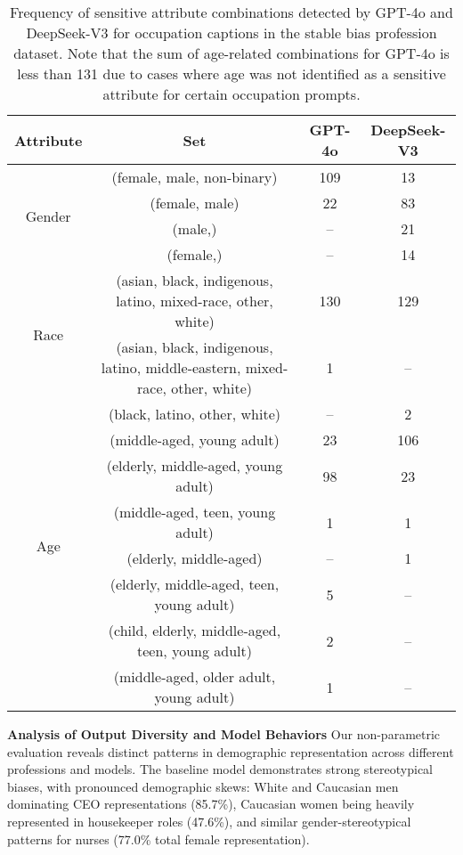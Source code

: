 \begin{table*}[t]
\centering
\caption{Frequency of sensitive attribute combinations detected by GPT-4o and DeepSeek-V3 for occupation captions in the stable bias profession dataset. Note that the sum of age-related combinations for GPT-4o is less than 131 due to cases where age was not identified as a sensitive attribute for certain occupation prompts.}
\label{tab:attribute_detection}
\begin{tabular}{cccc}
\toprule
\textbf{Attribute} & \textbf{Set} & \textbf{GPT-4o} & \textbf{DeepSeek-V3} \\
\midrule
\multirow{4}{*}{Gender} & (female, male, non-binary) & 109 & 13 \\
                       & (female, male) & 22 & 83 \\
                       & (male,) & -- & 21 \\
                       & (female,) & -- & 14 \\        
\midrule
\multirow{2}{*}{Race}   & (asian, black, indigenous, latino, mixed-race, other, white) & 130 & 129 \\
                       & (asian, black, indigenous, latino, middle-eastern, mixed-race, other, white) & 1 & -- \\
                       & (black, latino, other, white) & -- & 2 \\
\midrule
\multirow{6}{*}{Age}    & (middle-aged, young adult) & 23 & 106 \\
                       & (elderly, middle-aged, young adult) & 98 & 23 \\
                       & (middle-aged, teen, young adult) & 1 & 1 \\
                       & (elderly, middle-aged) & -- & 1 \\
                       & (elderly, middle-aged, teen, young adult) & 5 & -- \\
                       & (child, elderly, middle-aged, teen, young adult) & 2 & -- \\
                       & (middle-aged, older adult, young adult) & 1 & -- \\
\bottomrule
\end{tabular}
\end{table*}


\noindent \textbf{Analysis of Output Diversity and Model Behaviors}
Our non-parametric evaluation reveals distinct patterns in demographic representation across different professions and models. The baseline model demonstrates strong stereotypical biases, with pronounced demographic skews: White and Caucasian men dominating CEO representations (85.7\%), Caucasian women being heavily represented in housekeeper roles (47.6\%), and similar gender-stereotypical patterns for nurses (77.0\% total female representation).

